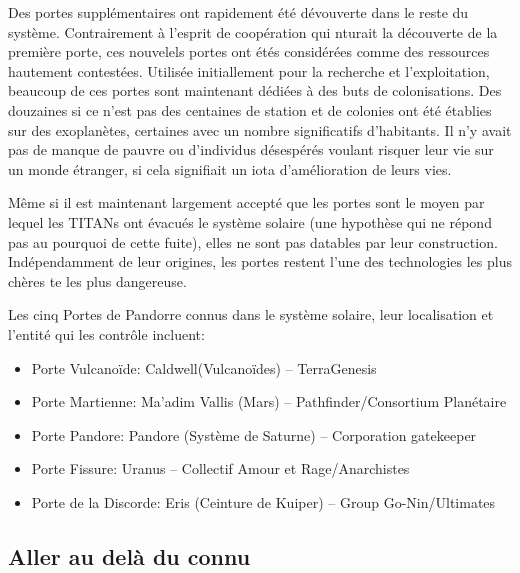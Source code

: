       Des portes supplémentaires ont rapidement été dévouverte dans le reste du système. Contrairement à l'esprit de coopération qui nturait la découverte de la première porte, ces nouvelels portes ont étés considérées comme des ressources hautement contestées. Utilisée initiallement pour la recherche et l'exploitation, beaucoup de ces portes sont maintenant dédiées à des buts de colonisations. Des douzaines si ce n'est pas des centaines de station et de colonies ont été établies sur des exoplanètes, certaines avec un nombre significatifs d'habitants. Il n'y avait pas de manque de pauvre ou d'individus désespérés voulant risquer leur vie sur un monde étranger, si cela signifiait un iota d'amélioration de leurs vies. 

      Même si il est maintenant largement accepté que les portes sont le moyen par lequel les TITANs ont évacués le système solaire (une hypothèse qui ne répond pas au pourquoi de cette fuite), elles ne sont pas datables par leur construction. Indépendamment de leur origines, les portes restent l'une des technologies les plus chères te les plus dangereuse. 

      Les cinq Portes de Pandorre connus dans le système solaire, leur localisation et l'entité qui les contrôle incluent: 

      \begin{itemize} 
         \item Porte Vulcanoïde: Caldwell(Vulcanoïdes) -- TerraGenesis 
         \item Porte Martienne: Ma'adim Vallis (Mars) -- Pathfinder/Consortium Planétaire 
         \item Porte Pandore: Pandore (Système de Saturne) -- Corporation gatekeeper 
         \item Porte Fissure: Uranus -- Collectif Amour et Rage/Anarchistes 
         \item Porte de la Discorde: Eris (Ceinture de Kuiper) -- Group Go-Nin/Ultimates \end{itemize} 

            \subsection{Aller au delà du connu} \label{sec:going-beyond-known} 

